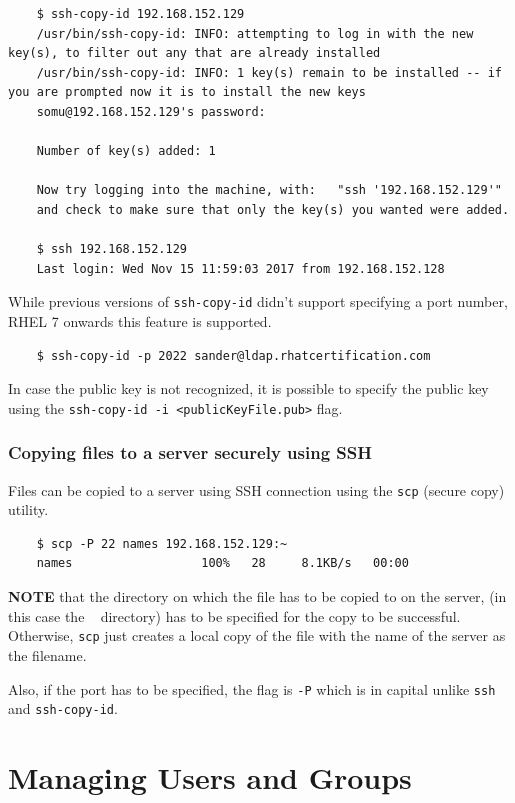 \documentclass{report}
\begin{document}
	\begin{verbatim}
	$ ssh-copy-id 192.168.152.129
	/usr/bin/ssh-copy-id: INFO: attempting to log in with the new key(s), to filter out any that are already installed
	/usr/bin/ssh-copy-id: INFO: 1 key(s) remain to be installed -- if you are prompted now it is to install the new keys
	somu@192.168.152.129's password: 
	
	Number of key(s) added: 1
	
	Now try logging into the machine, with:   "ssh '192.168.152.129'"
	and check to make sure that only the key(s) you wanted were added.
	
	$ ssh 192.168.152.129
	Last login: Wed Nov 15 11:59:03 2017 from 192.168.152.128
	\end{verbatim}
	
	While previous versions of \verb|ssh-copy-id| didn't support specifying a port number, RHEL 7 onwards this feature is supported. 
	
	\begin{verbatim}
	$ ssh-copy-id -p 2022 sander@ldap.rhatcertification.com
	\end{verbatim}
	
	In case the public key is not recognized, it is possible to specify the public key using the \verb|ssh-copy-id -i <publicKeyFile.pub>| flag.
	
	\subsection{Copying files to a server securely using SSH}
	Files can be copied to a server using SSH connection using the \verb|scp| (secure copy) utility. 
	
	\begin{verbatim}
	$ scp -P 22 names 192.168.152.129:~
	names                  100%   28     8.1KB/s   00:00    
	\end{verbatim}
	
	\noindent
	\textbf{NOTE} that the directory on which the file has to be copied to on the server, (in this case the ~ directory) has to be specified for the copy to be successful. Otherwise, \verb|scp| just creates a local copy of the file with the name of the server as the filename. 
	
	Also, if the port has to be specified, the flag is \verb|-P| which is in capital unlike \verb|ssh| and \verb|ssh-copy-id|. 
	
	\chapter{Managing Users and Groups}
\end{document}
